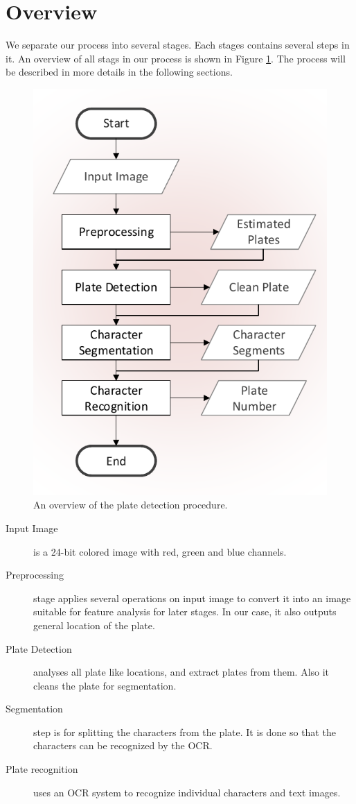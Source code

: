 \documentclass{standalone}
\begin{document}
\section{Overview}
We separate our process into several stages. Each stages contains several steps in it. An overview of all stags in our process is shown in Figure \ref{fig:ProcessOverview}. The process will be described in more details in the following sections.

\begin{figure} 
	\centering
	\includegraphics[width=0.8\linewidth]{./img/plots/overview}
	\caption{An overview of the plate detection procedure.} 
	\label{fig:ProcessOverview}
\end{figure}

\begin{description}
\item [Input Image] is a 24-bit colored image with red, green and blue channels.
\item [Preprocessing] stage applies several operations on input image to convert it into an image suitable for feature analysis for later stages. In our case, it also outputs general location of the plate.
\item [Plate Detection] analyses all plate like locations, and extract plates from them. Also it cleans the plate for segmentation.
\item [Segmentation] step is for splitting the characters from the plate. It is done so that the characters can be recognized by the OCR.
\item [Plate recognition] uses an OCR system to recognize individual characters and text images.
\end{description}
\end{document}
